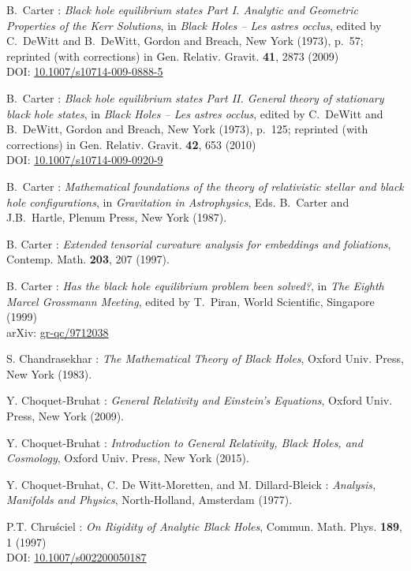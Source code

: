 \begin{thebibliography}{123}
B.~Carter : {\em Black hole equilibrium states Part I.
Analytic and Geometric Properties of the Kerr Solutions},
in {\em Black Holes -- Les astres occlus},  edited by C.~DeWitt and B.~DeWitt,
Gordon and Breach, New York (1973), p.~57; reprinted (with corrections) in
Gen. Relativ. Gravit. {\bf 41}, 2873 (2009)\\
DOI: \href{https://doi.org/10.1007/s10714-009-0888-5}{10.1007/s10714-009-0888-5}

B.~Carter : {\em Black hole equilibrium states Part II. General theory of stationary black hole states}, in {\em Black Holes -- Les astres occlus},  edited by C.~DeWitt and B.~DeWitt,
Gordon and Breach, New York (1973), p.~125; reprinted (with corrections) in
Gen. Relativ. Gravit. {\bf 42}, 653 (2010)\\
DOI: \href{https://doi.org/10.1007/s10714-009-0920-9}{10.1007/s10714-009-0920-9}

B.~Carter : {\em Mathematical foundations of the theory of
relativistic stellar and black hole configurations},
in {\em Gravitation in Astrophysics}, Eds. B.~Carter and J.B.~Hartle,
Plenum Press, New York (1987).

B. Carter : {\em Extended tensorial curvature analysis for embeddings
and foliations},
Contemp. Math. {\bf 203}, 207 (1997).

B. Carter : {\em Has the black hole equilibrium problem been solved?},
in {\em The Eighth Marcel Grossmann Meeting}, edited by T.~Piran,
World Scientific, Singapore (1999)\\
arXiv: \href{https://arxiv.org/abs/gr-qc/9712038}{gr-qc/9712038}

S. Chandrasekhar : {\em The Mathematical Theory of Black Holes},
Oxford Univ. Press, New York (1983).

Y. Choquet-Bruhat : {\em General Relativity and Einstein's Equations},
Oxford Univ. Press, New York (2009).

Y. Choquet-Bruhat : {\em Introduction to General Relativity, Black Holes, and
Cosmology}, Oxford Univ. Press, New York (2015).

Y. Choquet-Bruhat, C. De Witt-Moretten, and M. Dillard-Bleick :
{\em Analysis, Manifolds and Physics},
North-Holland, Amsterdam (1977).

P.T. Chru\'sciel : {\em On Rigidity of Analytic Black Holes},
Commun. Math. Phys. {\bf 189}, 1 (1997) \\
DOI: \href{https://doi.org/10.1007/s002200050187}{10.1007/s002200050187}


\end{thebibliography}
